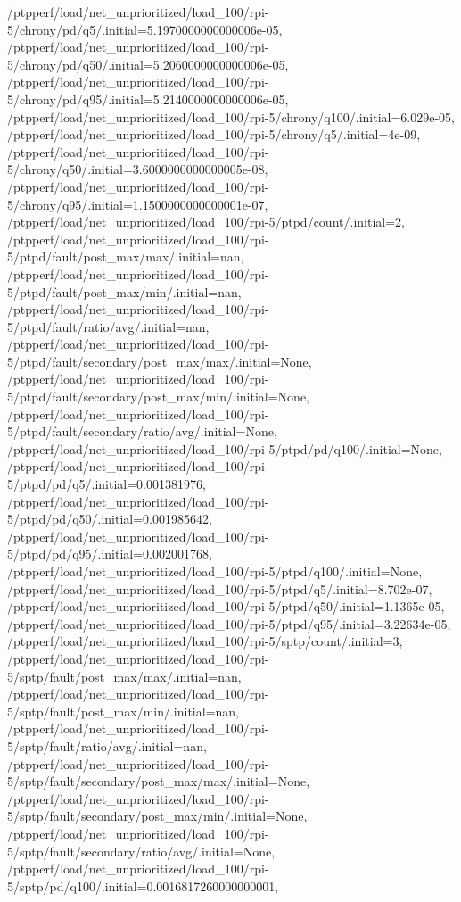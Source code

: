{    /ptpperf/load/net_unprioritized/load_100/rpi-5/chrony/pd/q5/.initial=5.1970000000000006e-05,
    /ptpperf/load/net_unprioritized/load_100/rpi-5/chrony/pd/q50/.initial=5.2060000000000006e-05,
    /ptpperf/load/net_unprioritized/load_100/rpi-5/chrony/pd/q95/.initial=5.2140000000000006e-05,
    /ptpperf/load/net_unprioritized/load_100/rpi-5/chrony/q100/.initial=6.029e-05,
    /ptpperf/load/net_unprioritized/load_100/rpi-5/chrony/q5/.initial=4e-09,
    /ptpperf/load/net_unprioritized/load_100/rpi-5/chrony/q50/.initial=3.6000000000000005e-08,
    /ptpperf/load/net_unprioritized/load_100/rpi-5/chrony/q95/.initial=1.1500000000000001e-07,
    /ptpperf/load/net_unprioritized/load_100/rpi-5/ptpd/count/.initial=2,
    /ptpperf/load/net_unprioritized/load_100/rpi-5/ptpd/fault/post_max/max/.initial=nan,
    /ptpperf/load/net_unprioritized/load_100/rpi-5/ptpd/fault/post_max/min/.initial=nan,
    /ptpperf/load/net_unprioritized/load_100/rpi-5/ptpd/fault/ratio/avg/.initial=nan,
    /ptpperf/load/net_unprioritized/load_100/rpi-5/ptpd/fault/secondary/post_max/max/.initial=None,
    /ptpperf/load/net_unprioritized/load_100/rpi-5/ptpd/fault/secondary/post_max/min/.initial=None,
    /ptpperf/load/net_unprioritized/load_100/rpi-5/ptpd/fault/secondary/ratio/avg/.initial=None,
    /ptpperf/load/net_unprioritized/load_100/rpi-5/ptpd/pd/q100/.initial=None,
    /ptpperf/load/net_unprioritized/load_100/rpi-5/ptpd/pd/q5/.initial=0.001381976,
    /ptpperf/load/net_unprioritized/load_100/rpi-5/ptpd/pd/q50/.initial=0.001985642,
    /ptpperf/load/net_unprioritized/load_100/rpi-5/ptpd/pd/q95/.initial=0.002001768,
    /ptpperf/load/net_unprioritized/load_100/rpi-5/ptpd/q100/.initial=None,
    /ptpperf/load/net_unprioritized/load_100/rpi-5/ptpd/q5/.initial=8.702e-07,
    /ptpperf/load/net_unprioritized/load_100/rpi-5/ptpd/q50/.initial=1.1365e-05,
    /ptpperf/load/net_unprioritized/load_100/rpi-5/ptpd/q95/.initial=3.22634e-05,
    /ptpperf/load/net_unprioritized/load_100/rpi-5/sptp/count/.initial=3,
    /ptpperf/load/net_unprioritized/load_100/rpi-5/sptp/fault/post_max/max/.initial=nan,
    /ptpperf/load/net_unprioritized/load_100/rpi-5/sptp/fault/post_max/min/.initial=nan,
    /ptpperf/load/net_unprioritized/load_100/rpi-5/sptp/fault/ratio/avg/.initial=nan,
    /ptpperf/load/net_unprioritized/load_100/rpi-5/sptp/fault/secondary/post_max/max/.initial=None,
    /ptpperf/load/net_unprioritized/load_100/rpi-5/sptp/fault/secondary/post_max/min/.initial=None,
    /ptpperf/load/net_unprioritized/load_100/rpi-5/sptp/fault/secondary/ratio/avg/.initial=None,
    /ptpperf/load/net_unprioritized/load_100/rpi-5/sptp/pd/q100/.initial=0.0016817260000000001,
}
